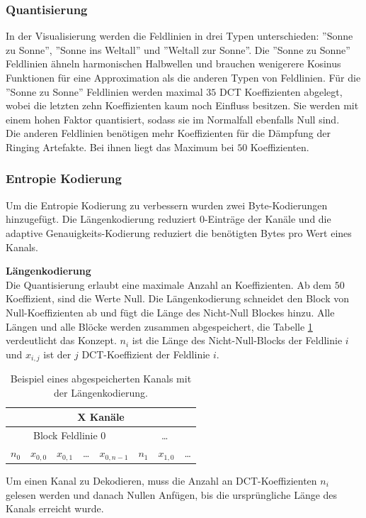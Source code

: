 \subsubsection{Quantisierung}
In der Visualisierung werden die Feldlinien in drei Typen unterschieden: ''Sonne zu Sonne'', ''Sonne ins Weltall'' und ''Weltall zur Sonne''.  Die ''Sonne zu Sonne'' Feldlinien ähneln harmonischen Halbwellen und brauchen wenigerere Kosinus Funktionen für eine Approximation als die anderen Typen von Feldlinien. Für die ''Sonne zu Sonne'' Feldlinien werden maximal $35$ DCT Koeffizienten abgelegt, wobei die letzten zehn Koeffizienten kaum noch Einfluss besitzen. Sie werden mit einem hohen Faktor quantisiert, sodass sie im Normalfall ebenfalls Null sind.\\
Die anderen Feldlinien benötigen mehr Koeffizienten für die Dämpfung der Ringing Artefakte. Bei ihnen liegt das Maximum bei $50$ Koeffizienten.

\subsubsection{Entropie Kodierung}\label{konzept:loesung1:kodierung}
Um die Entropie Kodierung zu verbessern wurden zwei Byte-Kodierungen hinzugefügt. Die Längenkodierung reduziert 0-Einträge der Kanäle und die adaptive Genauigkeits-Kodierung reduziert die benötigten Bytes pro Wert eines Kanals.

\textbf{Längenkodierung}\\
Die Quantisierung erlaubt eine maximale Anzahl an Koeffizienten. Ab dem $50$ Koeffizient, sind die Werte Null. Die Längenkodierung schneidet den Block von Null-Koeffizienten ab und fügt die Länge des Nicht-Null Blockes hinzu. Alle Längen und alle Blöcke werden zusammen abgespeichert, die Tabelle \ref{konzept:loesung1:entropie:laengenkodierung} verdeutlicht das Konzept. $n_i$ ist die Länge des Nicht-Null-Blocks der Feldlinie $i$ und $x_{i,j}$ ist der $j$ DCT-Koeffizient der Feldlinie $i$.

\begin{table}[!htbp]
	\center
	\begin{tabular}{||c|c|c|c|c||c|c|c}
		\hline
		\multicolumn{8}{|c|}{X Kanäle}\\\hline\hline
		 \multicolumn{5}{||c||}{Block Feldlinie 0} & \multicolumn{3}{c}{\ldots} \\\hline
		$n_0$ &$x_{0,0}$ &$x_{0,1}$ & \ldots & $x_{0,n-1}$ & $n_1$ & $x_{1,0}$ & \ldots\\\hline
	\end{tabular}
	\caption{Beispiel eines abgespeicherten Kanals mit der Längenkodierung.}
	\label{konzept:loesung1:entropie:laengenkodierung}
\end{table}
Um einen Kanal zu Dekodieren, muss die Anzahl an DCT-Koeffizienten $n_i$ gelesen werden und danach Nullen Anfügen, bis die ursprüngliche Länge des Kanals erreicht wurde.

